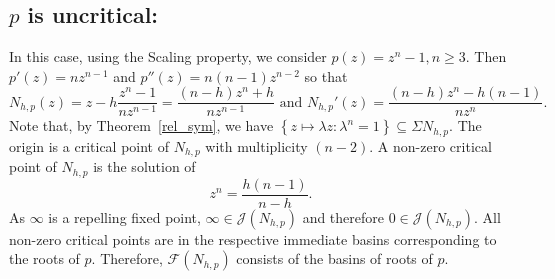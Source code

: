 \documentclass[12pt]{article}
\numberwithin{equation}{section}
\begin{document}
\subsection{$p$ is uncritical:}
In this case, using the Scaling property, we consider $p(z)=z^{n}-1, n \geq 3$. Then
$p'(z)=n z^{n-1}$ and $ p''(z)=n(n-1) z^{n-2}$
so that $$N_{h, p}(z)=z-h \frac{z^{n}-1}{n z^{n-1}}=\frac{(n-h) z^{n}+h}{n z^{n-1}} \text{ and } N_{h, p}'(z)=\frac{(n-h) z^{n}-h(n-1)}{n z^{n}}.$$
Note that, by Theorem~\ref{rel_sym}, we have $\left\{z \mapsto \lambda z: \lambda^{n}=1\right\} \subseteq \Sigma N_{h, p}.$ The origin is a critical point of $N_{h, p}$ with multiplicity $(n-2)$. A non-zero critical point of $N_{h, p}$ is the solution of
$$
z^{n}=\frac{h(n-1)}{n-h}.
$$
As $\infty$ is a repelling fixed point, $\infty \in \mathcal{J}\left(N_{h, p}\right)$ and therefore $0 \in \mathcal{J}\left(N_{h, p}\right)$. All non-zero critical points are in the respective immediate basins corresponding to the roots of $p$. Therefore, $\mathcal{F}(N_{h,p})$ consists of the basins of roots of $p$.
\end{document}
